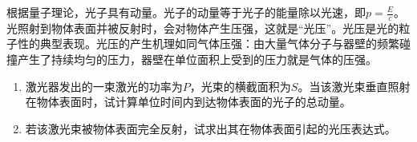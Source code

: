 根据量子理论，光子具有动量。光子的动量等于光子的能量除以光速，即\(p = \frac{E}{c}\)。光照射到物体表面并被反射时，会对物体产生压强，这就是“光压”。光压是光的粒子性的典型表现。光压的产生机理如同气体压强：由大量气体分子与器壁的频繁碰撞产生了持续均匀的压力，器壁在单位面积上受到的压力就是气体的压强。
\begin{enumerate}
	\item 激光器发出的一束激光的功率为\(P\)，光束的横截面积为\(S\)。当该激光束垂直照射在物体表面时，试计算单位时间内到达物体表面的光子的总动量。
	\item 若该激光束被物体表面完全反射，试求出其在物体表面引起的光压表达式。
\end{enumerate}
\begin{answer}
    
\end{answer}